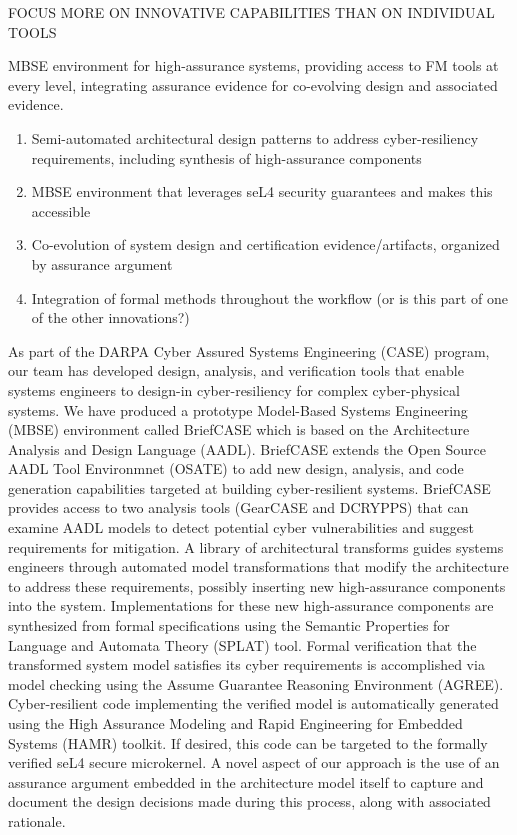 FOCUS MORE ON INNOVATIVE CAPABILITIES THAN ON INDIVIDUAL TOOLS

MBSE environment for high-assurance systems, providing access to FM tools at every level, integrating assurance evidence for co-evolving design and associated evidence.

\begin{enumerate}
\item Semi-automated architectural design patterns to address cyber-resiliency requirements, including synthesis of high-assurance components
\item MBSE environment that leverages seL4 security guarantees and makes this accessible
\item Co-evolution of system design and certification evidence/artifacts, organized by assurance argument
\item Integration of formal methods throughout the workflow (or is this part of one of the other innovations?)
\end{enumerate}

As part of the DARPA Cyber Assured Systems Engineering (CASE) program,
our team has developed design, analysis, and verification
tools that enable systems engineers to design-in cyber-resiliency
for complex cyber-physical systems. We have produced a prototype
Model-Based Systems Engineering (MBSE) environment called
BriefCASE which is based on the Architecture Analysis and Design
Language (AADL). BriefCASE extends the Open Source AADL
Tool Environmnet (OSATE) to add new design, analysis, and code
generation capabilities targeted at building cyber-resilient systems.
BriefCASE provides access to two analysis tools (GearCASE 
and DCRYPPS) that can examine AADL models to detect potential
cyber vulnerabilities and suggest requirements for mitigation.
A library of architectural transforms guides systems engineers
through automated model transformations that modify the
architecture to address these requirements, possibly inserting new
high-assurance components into the system. Implementations for
these new high-assurance components are synthesized from formal
specifications using the Semantic Properties for Language and
Automata Theory (SPLAT) tool. Formal verification that the
transformed system model satisfies its cyber requirements is accomplished
via model checking using the Assume Guarantee Reasoning
Environment (AGREE). Cyber-resilient code implementing the
verified model is automatically generated using the High Assurance
Modeling and Rapid Engineering for Embedded Systems (HAMR)
toolkit. If desired, this code can be targeted to the formally
verified seL4 secure microkernel.
A novel aspect of our approach is the use of an assurance argument
embedded in the architecture model itself to capture and
document the design decisions made during this process, along
with associated rationale.
